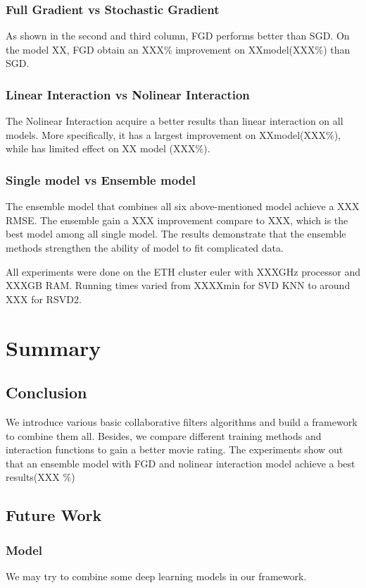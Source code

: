 \documentclass[10pt,conference,compsocconf]{IEEEtran}
\begin{document}
\subsubsection{Full Gradient vs Stochastic Gradient}
As shown in the second and third column, FGD performs better than SGD. On the model XX, FGD obtain an XXX\% improvement on XXmodel(XXX\%) than SGD. 

\subsubsection{Linear Interaction vs Nolinear Interaction}
The Nolinear Interaction acquire a better results than linear interaction on all models. More specifically, it has a largest improvement on XXmodel(XXX\%), while has limited effect on XX model (XXX\%).

\subsubsection{Single model vs Ensemble model}
The ensemble model that combines all six above-mentioned model achieve a XXX RMSE. The ensemble gain a XXX improvement compare to XXX, which is the best model among all single model. The results demonstrate that the ensemble methods strengthen the ability of model to fit complicated data.


All experiments were done on the ETH cluster euler with XXXGHz processor and XXXGB RAM. Running times varied from XXXXmin for SVD KNN to around XXX for RSVD2.

\section{Summary}
\subsection{Conclusion}
We introduce various basic collaborative filters algorithms and build a framework to combine them all. Besides, we compare different training methods and interaction functions to gain a better movie rating. The experiments show out that an ensemble model with FGD and nolinear interaction model achieve a best results(XXX \%)

\subsection{Future Work} 
\subsubsection{Model} 
We may try to combine some deep learning models in our framework.
\end{document}
